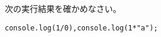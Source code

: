 \begin{Prob}\upshape\Must
 次の実行結果を確かめなさい。

 \texttt{console.log(1/0),console.log(1*"a");}%
\end{Prob}
